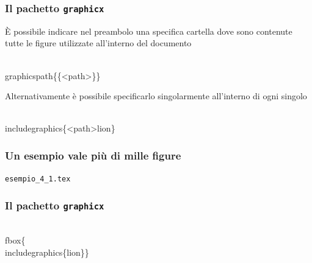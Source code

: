 \documentclass[svgnames,%
	ucs,%
	pdftex]{guitbeamer}
\begin{document}
\begin{frame}
  \frametitle{Il pachetto \texttt{graphicx}}
	\`E possibile indicare nel preambolo una specifica cartella dove sono contenute tutte le figure utilizzate all'interno del documento 
	\begin{LaTeXcode}
		\alert{\\graphicspath\{\{}<path>\alert{\}\}}
	\end{LaTeXcode}
	Alternativamente \`e possibile specificarlo singolarmente all'interno di ogni singolo 
	\begin{LaTeXcode}
		\\includegraphics\{\alert{<path>}lion\}
	\end{LaTeXcode}
\end{frame}
\begin{frame}
  \frametitle{Un esempio vale pi\`u di mille figure}
	\begin{center}
		\alert{\texttt{esempio\_4\_1.tex}}
	\end{center}
\end{frame}
\begin{frame}
  \frametitle{Il pachetto \texttt{graphicx}}
	\begin{LaTeXcode}
		\alert{\\fbox\{}\\includegraphics\{lion\}\alert{\}}
	\end{LaTeXcode}
	\begin{center}
	\end{center}
\end{frame}
\end{document}

